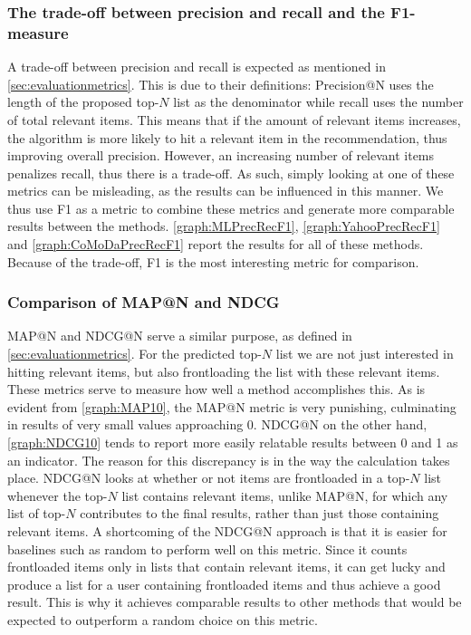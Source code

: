 \subsubsection{The trade-off between precision and recall and the F1-measure}\label{subsub:precrectradeoff}
A trade-off between precision and recall is expected as mentioned in \autoref{sec:evaluationmetrics}.
This is due to their definitions: Precision@N uses the length of the proposed top-$N$ list as the denominator while recall uses the number of total relevant items.
This means that if the amount of relevant items increases, the algorithm is more likely to hit a relevant item in the recommendation, thus improving overall precision.
However, an increasing number of relevant items penalizes recall, thus there is a trade-off.
As such, simply looking at one of these metrics can be misleading, as the results can be influenced in this manner.
We thus use F1 as a metric to combine these metrics and generate more comparable results between the methods.
\autoref{graph:MLPrecRecF1}, \autoref{graph:YahooPrecRecF1} and \autoref{graph:CoMoDaPrecRecF1} report the results for all of these methods.
Because of the trade-off, F1 is the most interesting metric for comparison.

\subsubsection{Comparison of MAP@N and NDCG}
MAP@N and NDCG@N serve a similar purpose, as defined in \autoref{sec:evaluationmetrics}.
For the predicted top-$N$ list we are not just interested in hitting relevant items, but also frontloading the list with these relevant items.
These metrics serve to measure how well a method accomplishes this.
As is evident from \autoref{graph:MAP10}, the MAP@N metric is very punishing, culminating in results of very small values approaching 0.
NDCG@N on the other hand, \autoref{graph:NDCG10} tends to report more easily relatable results between 0 and 1 as an indicator.
The reason for this discrepancy is in the way the calculation takes place.
NDCG@N looks at whether or not items are frontloaded in a top-$N$ list whenever the top-$N$ list contains relevant items, unlike MAP@N, for which any list of top-$N$ contributes to the final results, rather than just those containing relevant items.
A shortcoming of the NDCG@N approach is that it is easier for baselines such as random to perform well on this metric.
Since it counts frontloaded items only in lists that contain relevant items, it can get lucky and produce a list for a user containing frontloaded items and thus achieve a good result.
This is why it achieves comparable results to other methods that would be expected to outperform a random choice on this metric.

